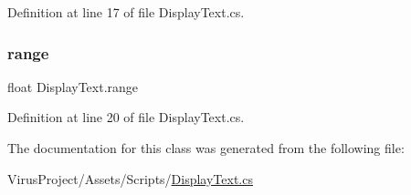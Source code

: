 Definition at line 17 of file Display\+Text.\+cs.

\hypertarget{class_display_text_a284398d2c2ca647b4828d384496447ba}{}\label{class_display_text_a284398d2c2ca647b4828d384496447ba} 
\subsubsection{\texorpdfstring{range}{range}}
{\footnotesize\ttfamily float Display\+Text.\+range}



Definition at line 20 of file Display\+Text.\+cs.



The documentation for this class was generated from the following file\+:\begin{DoxyCompactItemize}
\item 
Virus\+Project/\+Assets/\+Scripts/\hyperlink{_display_text_8cs}{Display\+Text.\+cs}\end{DoxyCompactItemize}
